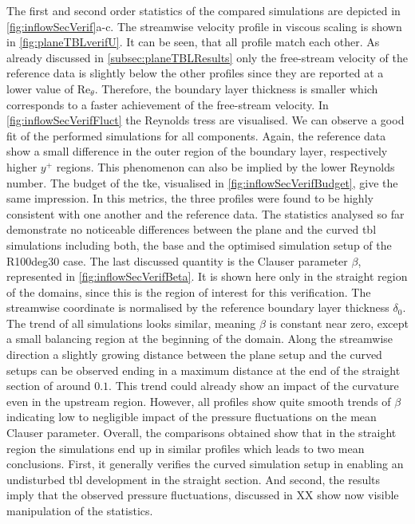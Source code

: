 The first and second order statistics of the compared simulations are depicted in \autoref{fig:inflowSecVerif}a-c.
The streamwise velocity profile in viscous scaling is shown in \autoref{fig:planeTBLverifU}.
It can be seen, that all profile match each other. 
As already discussed in \autoref{subsec:planeTBLResults} only the free-stream velocity of the reference data is slightly below the other profiles since they are reported at a lower value of $\mathrm{Re}_{\theta}$.
Therefore, the boundary layer thickness is smaller which corresponds to a faster achievement of the free-stream velocity.
In \autoref{fig:inflowSecVerifFluct} the Reynolds tress are visualised. 
We can observe a good fit of the performed simulations for all components.
Again, the reference data show a small difference in the outer region of the boundary layer, respectively higher $y^+$ regions.
This phenomenon can also be implied by the lower Reynolds number.
The budget of the \acrshort{tke}, visualised in \autoref{fig:inflowSecVerifBudget}, give the same impression.
In this metrics, the three profiles were found to be highly consistent with one another and the reference data.
The statistics analysed so far demonstrate no noticeable differences between the plane and the curved \acrshort{tbl} simulations including both, the base and the optimised simulation setup of the R100deg30 case.
The last discussed quantity is the Clauser parameter $\beta$, represented in \autoref{fig:inflowSecVerifBeta}.
It is shown here only in the straight region of the domains, since this is the region of interest for this verification.
The streamwise coordinate is normalised by the reference boundary layer thickness $\delta_0$.
The trend of all simulations looks similar, meaning $\beta$ is constant near zero, except a small balancing region at the beginning of the domain.
Along the streamwise direction a slightly growing distance between the plane setup and the curved setups can be observed ending in a maximum distance at the end of the straight section of around $0.1$.
This trend could already show an impact of the curvature even in the upstream region.
However, all profiles show quite smooth trends of $\beta$ indicating low to negligible impact of the pressure fluctuations on the mean Clauser parameter.
Overall, the comparisons obtained show that in the straight region the simulations end up in similar profiles which leads to two mean conclusions.
First, it generally verifies the curved simulation setup in enabling an undisturbed \acrshort{tbl} development in the straight section.
And second, the results imply that the observed pressure fluctuations, discussed in XX show now visible manipulation of the statistics.




